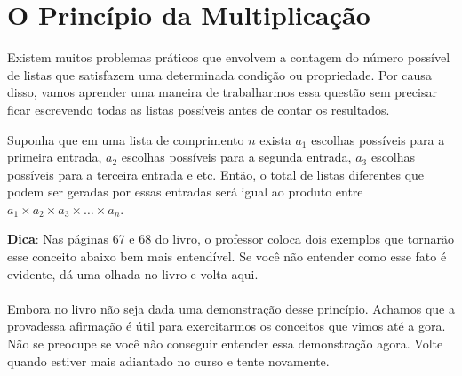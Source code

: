 \documentclass[main.tex]{subfiles}
\begin{document}
\section{O Princípio da Multiplicação}

Existem muitos problemas práticos que envolvem a contagem do número possível de listas que satisfazem uma determinada condição ou propriedade. Por causa disso, vamos aprender uma maneira de trabalharmos essa questão sem precisar ficar escrevendo todas as listas possíveis antes de contar os resultados.

\begin{fact}
Suponha que em uma lista de comprimento $n$ exista $a_1$ escolhas possíveis para a primeira entrada, $a_2$ escolhas possíveis para a segunda entrada, $a_3$ escolhas possíveis para a terceira entrada e etc. Então, o total de listas diferentes que podem ser geradas por essas entradas será igual ao produto entre $a_1 \times a_2 \times a_3 \times \dots \times a_n$. 
\end{fact}

\textbf{Dica}: Nas páginas 67 e 68 do livro, o professor coloca dois exemplos que tornarão esse conceito abaixo bem mais entendível. Se você não entender como esse fato é evidente, dá uma olhada no livro e volta aqui.
\\~\\
Embora no livro não seja dada uma demonstração desse princípio. Achamos que a provadessa afirmação é útil para exercitarmos os conceitos que vimos até a gora. Não se preocupe se você não conseguir entender essa demonstração agora. Volte quando estiver mais adiantado no curso e tente novamente.
\end{document}
